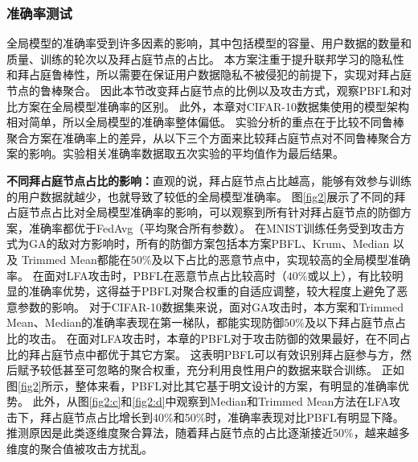 \subsubsection{准确率测试}
全局模型的准确率受到许多因素的影响，其中包括模型的容量、用户数据的数量和质量、训练的轮次以及拜占庭节点的占比。
本方案注重于提升联邦学习的隐私性和拜占庭鲁棒性，所以需要在保证用户数据隐私不被侵犯的前提下，实现对拜占庭节点的鲁棒聚合。
因此本节改变拜占庭节点的比例以及攻击方式，观察PBFL和对比方案在全局模型准确率的区别。
此外，本章对CIFAR-10数据集使用的模型架构相对简单，所以全局模型的准确率整体偏低。
实验分析的重点在于比较不同鲁棒聚合方案在准确率上的差异，从以下三个方面来比较拜占庭节点对不同鲁棒聚合方案的影响。实验相关准确率数据取五次实验的平均值作为最后结果。

\textbf{不同拜占庭节点占比的影响：}直观的说，拜占庭节点占比越高，能够有效参与训练的用户数据就越少，也就导致了较低的全局模型准确率。
图\ref{fig2}展示了不同的拜占庭节点占比对全局模型准确率的影响，可以观察到所有针对拜占庭节点的防御方案，准确率都优于FedAvg（平均聚合所有参数）。
在MNIST训练任务受到攻击方式为GA的敌对方影响时，所有的防御方案包括本方案PBFL、Krum、Median 以及 Trimmed Mean都能在$ 50\% $及以下占比的恶意节点中，实现较高的全局模型准确率。
在面对LFA攻击时，PBFL在恶意节点占比较高时（$40\%$或以上），有比较明显的准确率优势，这得益于PBFL对聚合权重的自适应调整，较大程度上避免了恶意参数的影响。
对于CIFAR-10数据集来说，面对GA攻击时，本方案和Trimmed Mean、Median的准确率表现在第一梯队，都能实现防御$50\%$及以下拜占庭节点占比的攻击。
在面对LFA攻击时，本章的PBFL对于攻击防御的效果最好，在不同占比的拜占庭节点中都优于其它方案。
这表明PBFL可以有效识别拜占庭参与方，然后赋予较低甚至可忽略的聚合权重，充分利用良性用户的数据来联合训练。
正如图\ref{fig2}所示，整体来看，PBFL对比其它基于明文设计的方案，有明显的准确率优势。
此外，从图\ref{fig2:c}和\ref{fig2:d}中观察到Median和Trimmed Mean方法在LFA攻击下，拜占庭节点占比增长到40\%和50\%时，准确率表现对比PBFL有明显下降。推测原因是此类逐维度聚合算法，随着拜占庭节点的占比逐渐接近50\%，越来越多维度的聚合值被攻击方扰乱。



